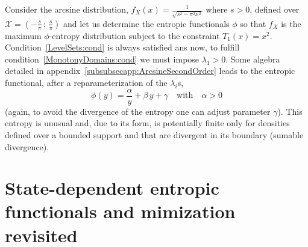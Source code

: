 \documentclass[entropy,article,submit,moreauthors,pdftex]{Definitions/mdpi}
\newcounter{arcsineExample}%
\newcommand{\SZ}[1]{{\color{blue} #1}}                                       %
\def\X{\mathcal{X}}%
\begin{document}
\begin{Example}\label{arcsine:ex}\setcounter{arcsineExample}{\value{example}}
   Consider the  arcsine distribution, \SZ{$f_X(x) =  \frac{1}{\sqrt{s^2 - \pi^2
         x^2}}$ \SZ{where $s > 0$}, defined  over $\X = \left( -\frac{s}{\pi} \,
     ; \, \frac{s}{\pi} \right)$} and let  us determine the entropic functionals
   $\phi$ so  that $f_X$ is  the maximum $\phi$-entropy distribution  subject to
   the constraint $T_1(x) =  x^2$.  \SZ{Condition~\ref{LevelSets:cond} is always
     satisfied ans now,} to fulfill condition~\ref{MonotonyDomains:cond} we must
   impose    $\lambda_1     >    0$.      Some    algebra     \SZ{detailed    in
     appendix~\ref{subsubsecapp:ArcsineSecondOrder}}   leads  to   the  entropic
   functional,  after  a reparameterization  of  the  $\lambda_i$s, $$\phi(y)  =
   \frac{\alpha}{y} + \beta  \, y + \gamma \quad \mbox{with}  \quad \alpha > 0$$
   \SZ{(again, to avoid  the divergence of the entropy one  can adjust parameter
     $\gamma$).} This  entropy is unusual and,  due to its form,  is potentially
   finite  only for  densities  defined  over a  bounded  support  and that  are
   divergent in its boundary (sumable divergence).
\end{Example}




\section{State-dependent entropic functionals and mimization revisited}
\label{sec:MultiformEnt}
\end{document}
